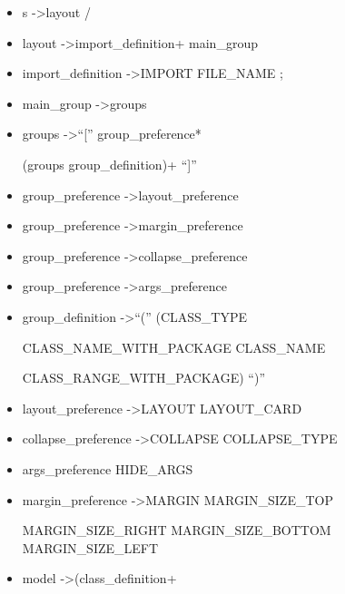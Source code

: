 

\begin{itemize}
  
\item s   -\textgreater   layout  /

 \item layout   -\textgreater   import{\_}definition+	main{\_}group

 \item import{\_}definition   -\textgreater   IMPORT  FILE{\_}NAME  ;

 \item main{\_}group   -\textgreater   groups

 \item groups   -\textgreater  ``['' group{\_}preference*  
 
 (groups \textbar group{\_}definition)+ ``]''

 \item group{\_}preference   -\textgreater   layout{\_}preference

 \item group{\_}preference   -\textgreater   margin{\_}preference

 \item group{\_}preference   -\textgreater   collapse{\_}preference

 \item group{\_}preference   -\textgreater   args{\_}preference

 \item group{\_}definition   -\textgreater   ``(''  (CLASS{\_}TYPE   
 
 \textbar   CLASS{\_}NAME{\_}WITH{\_}PACKAGE   \textbar   CLASS{\_}NAME   
 
 \textbar   CLASS{\_}RANGE{\_}WITH{\_}PACKAGE)  ``)''

 \item layout{\_}preference   -\textgreater   LAYOUT  LAYOUT{\_}CARD

 \item collapse{\_}preference   -\textgreater   COLLAPSE  COLLAPSE{\_}TYPE

 \item args{\_}preference  HIDE{\_}ARGS

 \item margin{\_}preference   -\textgreater   MARGIN  MARGIN{\_}SIZE{\_}TOP  
 
 MARGIN{\_}SIZE{\_}RIGHT  MARGIN{\_}SIZE{\_}BOTTOM  MARGIN{\_}SIZE{\_}LEFT

 \item model   -\textgreater   (class{\_}definition+  
 

\end{itemize}
